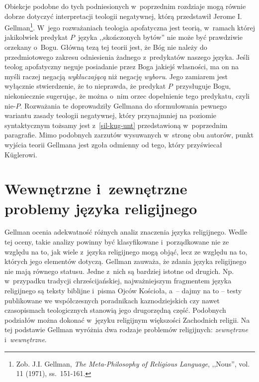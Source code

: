 Obiekcje podobne do tych podniesionych w~poprzednim rozdziaje mogą równie dobrze dotyczyć interpretacji teologii negatywnej, którą przedstawił Jerome I. Gellman\footnote{Zob. J.I. Gellman, \textit{The Meta-Philosophy of Religious Language}, ,,Nous'', vol. 11 (1971), ss.~151-161.}. W~jego rozważaniach teologia apofatyczna jest teorią, w~ramach której jakikolwiek predykat $P$~języka ,,skończonych bytów'' nie może być prawdziwie orzekany o~Bogu. Główną tezą tej teorii jest, że Bóg nie należy do przedmiotowego zakresu odniesienia żadnego z~predykatów naszego języka. Jeśli teolog apofatyczny neguje posiadanie przez Boga jakiejś własności, ma on na myśli raczej negacją \textit{wykluczającą} niż negację \textit{wyboru}. Jego zamiarem jest wyłącznie stwierdzenie, że to nieprawda, że predykat $P$~przysługuje Bogu, niekoniecznie sugerując, że można o~nim orzec dopełnienie tego predykatu, czyli nie-$P$. Rozważania te doprowadziły Gellmana do sformułowania pewnego wariantu zasady teologii negatywnej, który przynajmniej na poziomie syntaktycznym tożsamy jest z~\ref{sil-kug-unt} przedstawioną w~poprzednim paragrafie. Mimo podobnych zarzutów wysuwanych w~stronę obu autorów, punkt wyjścia teorii Gellmana jest zgoła odmienny od tego, który przyświecał Küglerowi.


\section{Wewnętrzne i~zewnętrzne problemy języka religijnego}

Gellman ocenia adekwatność różnych analiz znaczenia języka religijnego. Wedle tej oceny, takie analizy powinny być klasyfikowane i~porządkowane nie ze względu na to, jak wiele z~języka religijnego mogą objąć, lecz ze względu na to, których jego elementów dotyczą. Gellman zauważa, że zdania języka religijnego nie mają równego statusu. Jedne z~nich są bardziej istotne od drugich. Np. w~przypadku tradycji chrześcijańskiej, najważniejszym fragmentem języka religijnego są teksty biblijne i~pisma Ojców Kościoła, a~-- dajmy na to -- testy publikowane we współczesnych poradnikach kaznodziejskich czy nawet czasopismach teologicznych stanowią jego drugorzędną część. Podobnych podziałów można dokonać w~języku religijnym większości Zachodnich religii. Na tej podstawie Gellman wyróżnia dwa rodzaje problemów religijnych: \textit{zewnętrzne} i~\textit{wewnętrzne}.

